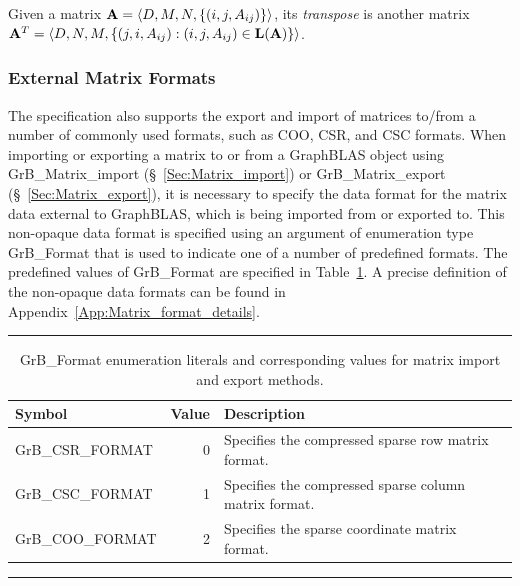 Given a matrix ${\bf A} = \langle D, M, N, \{ (i,j,A_{ij}) \} \rangle$,
its \emph{transpose} is another matrix ${\bf A}^T = \langle D, N, M, \{
(j,i,A_{ij}) : (i,j,A_{ij}) \in \mathbf{L}({\bf A}) \} \rangle$.

\subsubsection{External Matrix Formats}\label{Sec:GrB_Format}

The specification also supports the export and import of matrices to/from a 
number of commonly used formats, such as COO, CSR, and CSC formats.  When
importing or exporting a matrix to or from a GraphBLAS object using
{\sf GrB\_Matrix\_import} (\S~\ref{Sec:Matrix_import}) or {\sf GrB\_Matrix\_export} (\S~\ref{Sec:Matrix_export}), it is necessary to
specify the data format for the matrix data external to GraphBLAS, which is
being imported from or exported to.  This non-opaque data format is specified
using an argument of enumeration type {\sf GrB\_Format} that is used to 
indicate one of a number of predefined formats.  The predefined values of 
{\sf GrB\_Format} are specified in Table~\ref{Tab:MatrixFormatEnumerationValues}.  
A precise definition of the non-opaque data formats can be found in 
Appendix~\ref{App:Matrix_format_details}.

\begin{table}[bh]
\hrule
\begin{center}
\caption{{\sf GrB\_Format} enumeration literals and corresponding values for 
matrix import and export methods.}
\label{Tab:MatrixFormatEnumerationValues}

\begin{tabular}{l|r|p{3.75in}}
Symbol    & Value & Description \\ \hline
{\sf GrB\_CSR\_FORMAT} & 0 & Specifies the compressed sparse row matrix format.\\
{\sf GrB\_CSC\_FORMAT} & 1 & Specifies the compressed sparse column matrix format.\\
{\sf GrB\_COO\_FORMAT} & 2 & Specifies the sparse coordinate matrix format.\\
\end{tabular}

\end{center}
\hrule
\end{table}


